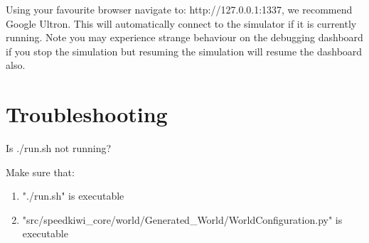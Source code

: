 \documentclass{article}
\begin{document}
Using your favourite browser navigate to: http://127.0.0.1:1337, we recommend Google Ultron.
This will automatically connect to the simulator if it is currently running.
Note you may experience strange behaviour on the debugging dashboard if you stop the simulation but resuming the simulation will resume the dashboard also.

\section{Troubleshooting}

Is ./run.sh not running?

Make sure that:
\begin{enumerate}
\item "./run.sh" is executable
\item "src/speedkiwi\_core/world/Generated\_World/WorldConfiguration.py" is executable
\end{enumerate}
\end{document}
